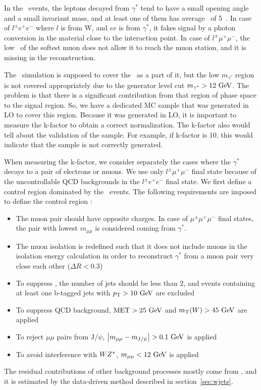 In the \wgammastar\ events, the leptons decayed from $\gamma^*$ tend to have 
a small opening angle and a small invariant mass, and at least one of them 
has average \pt\ of 5~\GeV. 
In case of $l^\pm e^+ e^-$ where $l$ is from W, and $ee$ is from $\gamma^*$, 
it fakes signal by a 
photon conversion in the material close to the interaction point.
In case of $l^\pm\mu^+\mu^-$, the low \pt\ of the softest muon does not allow 
it to reach the muon station, and it is missing in the reconstruction. 

The \wz\ simulation is supposed to cover the \wgammastar\ as a part of it, 
but the low $m_{\gamma^*}$ region is not covered appropriately due to the generator 
level cut $m_{\gamma^*}>12~\mathrm{Ge\kern -0.1em V}$. The problem is that there is a significant 
contribution from that region of phase space to the signal region.
So, we have a dedicated MC sample that was generated in LO to cover this region.
Because it was generated in LO, it is important to measure the k-factor 
to obtain a correct normalization. The k-factor also would tell about the 
validation of the sample. For example, if k-factor is 10, this would indicate 
that the sample is not correctly generated.

When measuring the k-factor, we consider separately 
the cases where the $\gamma^*$ decays to a pair of electrons or muons. 
We use only $l^\pm\mu^+\mu^-$ final state 
because of the uncontrollable QCD backgrounds in the $l^\pm e^+ e^-$ final state. 
We first define a control region dominated by the \wgammastar\ events. 
The following requirements are imposed to define the control region :  
\begin{itemize} 
\item The muon pair should have opposite charges. In case of $\mu^\pm\mu^+\mu^-$ final states, 
      the pair with lowest $m_{\mu\mu}$ is considered coming from $\gamma^*$.
\item The muon isolation is redefined such that it does not include muons in the isolation 
      energy calculation in order to reconstruct $\gamma^*$ from a muon pair very close each other 
      ($\Delta R < 0.3$)
\item To suppress \topbkg, the number of jets should be less than 2, and events containing at least 
      one b-tagged jets with $p_\mathrm{T}>10~\mathrm{Ge\kern -0.1em V}$ are excluded
\item To suppress QCD background, $\mathrm{MET}>25~\mathrm{Ge\kern -0.1em V}$ and $m_{\mathrm{T}}(W)>45~\mathrm{Ge\kern -0.1em V}$ are applied 
\item To reject $\mu\mu$ pairs from $\textrm{J}/\psi$, 
      $\left| m_{\mu\mu} - m_{\textrm{J}/\psi}\right| > 0.1~\mathrm{Ge\kern -0.1em V}$ is applied
\item To avoid interference with $WZ^*$, $m_{\mu\mu} < 12~\mathrm{Ge\kern -0.1em V}$ is applied
\end{itemize} 
The residual contributions of other background processes mostly come from \Wjets, 
and it is estimated by the data-driven method described in section~\ref{sec:wjets}.

